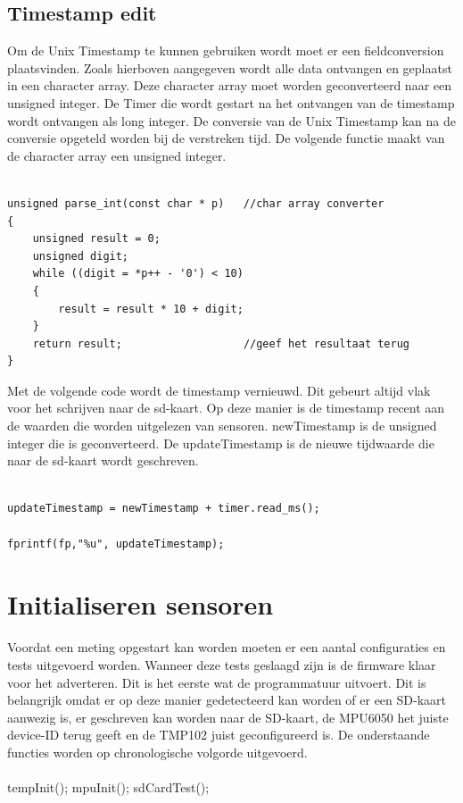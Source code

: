 \documentclass[12pt,a4paper]{report}
\begin{document}
\subsection{Timestamp edit}
Om de Unix Timestamp te kunnen gebruiken wordt moet er een fieldconversion plaatsvinden. Zoals hierboven aangegeven wordt alle data ontvangen en geplaatst in een character array. Deze character array moet worden geconverteerd naar een unsigned integer. De Timer die wordt gestart na het ontvangen van de timestamp wordt ontvangen als long integer. De conversie van de Unix Timestamp kan na de conversie opgeteld worden bij de verstreken tijd. De volgende functie maakt van de character array een unsigned integer.\\\\ 

\begin{lstlisting}
unsigned parse_int(const char * p)   //char array converter 
{
    unsigned result = 0;
    unsigned digit;
    while ((digit = *p++ - '0') < 10)
    {
        result = result * 10 + digit;           
    }    
    return result;                   //geef het resultaat terug
}
\end{lstlisting}

Met de volgende code wordt de timestamp vernieuwd. Dit gebeurt altijd vlak voor het schrijven naar de sd-kaart. Op deze manier is de timestamp recent aan de waarden die worden uitgelezen van sensoren. newTimestamp is de unsigned integer die is geconverteerd. De updateTimestamp is de nieuwe tijdwaarde die naar de sd-kaart wordt geschreven.\\\\

\begin{lstlisting}
updateTimestamp = newTimestamp + timer.read_ms();
             
fprintf(fp,"%u", updateTimestamp);
\end{lstlisting}
\newpage

\section{Initialiseren sensoren}
Voordat een meting opgestart kan worden moeten er een aantal configuraties en tests uitgevoerd worden. Wanneer deze tests geslaagd zijn is de firmware klaar voor het adverteren. Dit is het eerste wat de programmatuur uitvoert. Dit is belangrijk omdat er op deze manier gedetecteerd kan worden of er een SD-kaart aanwezig is, er geschreven kan worden naar de SD-kaart, de MPU6050 het juiste device-ID terug geeft en de TMP102 juist geconfigureerd is. De onderstaande functies worden op chronologische volgorde uitgevoerd.\\\\
tempInit();
mpuInit();
sdCardTest();
\end{document}
